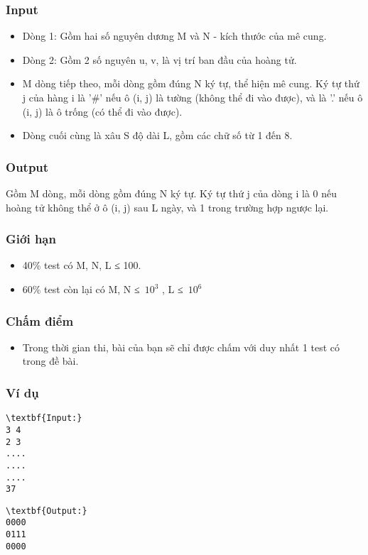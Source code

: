 \subsubsection{Input}
\begin{itemize}
	\item Dòng 1: Gồm hai số nguyên dương M và N - kích thước của mê cung.
	\item Dòng 2: Gồm 2 số nguyên u, v, là vị trí ban đầu của hoàng tử.
	\item M dòng tiếp theo, mỗi dòng gồm đúng N ký tự, thể hiện mê cung. Ký tự thứ j của hàng i là '\#' nếu ô (i, j) là tường (không thể đi vào được), và là '.' nếu ô (i, j) là ô trống (có thể đi vào được).
	\item Dòng cuối cùng là xâu S độ dài L, gồm các chữ số từ 1 đến 8.
\end{itemize}

\subsubsection{Output}

Gồm M dòng, mỗi dòng gồm đúng N ký tự. Ký tự thứ j của dòng i là 0 nếu hoàng tử không thể ở ô (i, j) sau L ngày, và 1 trong trường hợp ngược lại.

\subsubsection{Giới hạn}
\begin{itemize}
	\item 40\% test có M, N, L ≤ 100.
	\item 60\% test còn lại có M, N ≤ $10^{3}$ , L ≤ $10^{6}$
\end{itemize}

\subsubsection{Chấm điểm}
\begin{itemize}
	\item Trong thời gian thi, bài của bạn sẽ chỉ được chấm với duy nhất 1 test có trong đề bài.
\end{itemize}

\subsubsection{Ví dụ}
\begin{verbatim}
\textbf{Input:}
3 4
2 3
....
....
....
37\end{verbatim}
\begin{verbatim}
\textbf{Output:}
0000
0111
0000
\end{verbatim}
